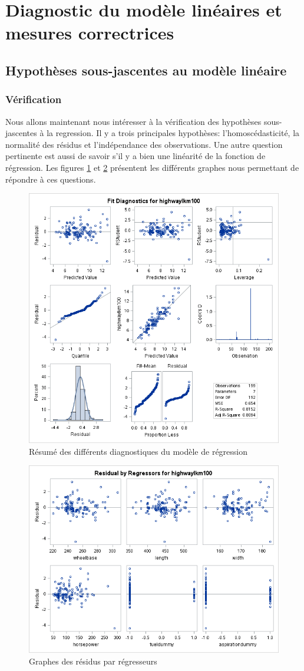 \documentclass[11pt,a4paper]{article}
\begin{document}
\section{Diagnostic du modèle linéaires et mesures correctrices}
\subsection{Hypothèses sous-jascentes au modèle linéaire}
\subsubsection{Vérification}
Nous allons maintenant nous intéresser à la vérification des hypothèses sous-jascentes à la regression.
Il y a trois principales hypothèses: l'homoscédasticité, la normalité des résidus et l'indépendance des observations. 
Une autre question pertinente est aussi de savoir s'il y a bien une linéarité de la fonction de régression. Les figures \ref{fig:diagnostics} et \ref{fig:regressors} présentent les différents graphes nous permettant de répondre à ces questions.
\begin{figure}
	\centering
	\includegraphics[width=0.7\linewidth]{fitdiagnostics}
	\caption{Résumé des différents diagnostiques du modèle de régression}
	\label{fig:diagnostics}
\end{figure}
\begin{figure}
	\centering
	\includegraphics[width=0.7\linewidth]{resbyregressors}
	\caption{Graphes des résidus par régresseurs}
	\label{fig:regressors}
\end{figure}
\end{document}
